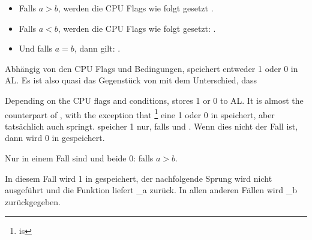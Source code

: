 \begin{itemize}
\item Falls $a>b$, werden die CPU Flags wie folgt gesetzt .
\item Falls $a<b$, werden die CPU Flags wie folgt gesetzt: .
\item Und falls $a=b$, dann gilt: .
\end{itemize}

Abhängig von den CPU Flags und Bedingungen, speichert \SETNBE entweder 1 oder 0
in AL.
Es ist also quasi das Gegenstück von \JNBE mit dem Unterschied, dass \SETcc

Depending on the CPU flags and conditions, \SETNBE stores 1 or 0 to AL. 
It is almost the counterpart of \JNBE, with the exception that \SETcc
\footnote{ is } eine 1 oder 0 in \AL speichert, aber
\Jcc tatsächlich auch springt.
\SETNBE speicher 1 nur, falls  und .
Wenn dies nicht der Fall ist, dann wird 0 in \AL gespeichert.

Nur in einem Fall sind \CF und \ZF beide 0: falls $a>b$.

In diesem Fall wird 1 in \AL gespeichert, der nachfolgende \JZ Sprung wird nicht
ausgeführt und die Funktion liefert {\_a} zurück. In allen anderen Fällen wird
{\_b} zurückgegeben.